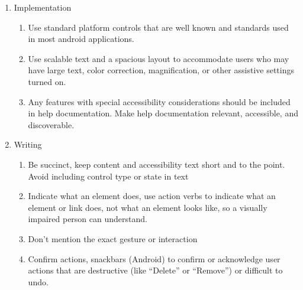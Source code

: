 \begin{enumerate}
\begin{enumerate}
        \end{enumerate}
    \item{Implementation  }
    	\begin{enumerate}
        \item{Use standard platform controls that are well known and standards used in most android applications.}
        \item{Use scalable text and a spacious layout to accommodate users who may have large text, color correction, magnification, or other assistive settings turned on.}
        \item{Any features with special accessibility considerations should be included in help documentation. Make help documentation relevant, accessible, and discoverable.}
        \end{enumerate}
    \item{Writing}
    	\begin{enumerate}
        	\item{Be succinct, keep content and accessibility text short and to the point. Avoid including control type or state in text }
            \item{Indicate what an element does, use action verbs to indicate what an element or link does, not what an element looks like, so a visually impaired person can understand.}
            \item{Don’t mention the exact gesture or interaction}
            \item{Confirm actions, snackbars (Android) to confirm or acknowledge user actions that are destructive (like “Delete” or “Remove”) or difficult to undo. }

        \end{enumerate}
   \end{enumerate}